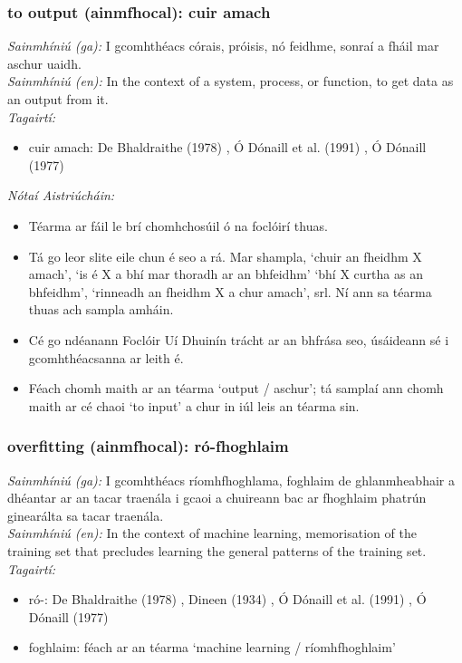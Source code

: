 \subsubsection*{to output (ainmfhocal): cuir amach}
 \noindent \textit{Sainmhíniú (ga):} I gcomhthéacs córais, próisis, nó feidhme, sonraí a fháil mar aschur uaidh.
\\
 \noindent \textit{Sainmhíniú (en):} In the context of a system, process, or function, to get data as an output from it.
\\
 \noindent \textit{Tagairtí:}
\begin{itemize}
	\item cuir amach: De Bhaldraithe (1978) \cite{de-bhaldraithe}, Ó Dónaill et al. (1991) \cite{focloir-beag}, Ó Dónaill (1977) \cite{odonaill}
\end{itemize}

 \noindent \textit{Nótaí Aistriúcháin:}
\begin{itemize}
	\item Téarma ar fáil le brí chomhchosúil ó na foclóirí thuas.
	\item Tá go leor slite eile chun é seo a rá. Mar shampla, `chuir an fheidhm X amach', `is é X a bhí mar thoradh ar an bhfeidhm' `bhí X curtha as an bhfeidhm', `rinneadh an fheidhm X a chur amach', srl. Ní ann sa téarma thuas ach sampla amháin.
	\item Cé go ndéanann Foclóir Uí Dhuinín trácht ar an bhfrása seo, úsáideann sé i gcomhthéacsanna ar leith é.
	\item Féach chomh maith ar an téarma `output / aschur'; tá samplaí ann chomh maith ar cé chaoi `to input' a chur in iúl leis an téarma sin.
\end{itemize}


\subsubsection*{overfitting (ainmfhocal): ró-fhoghlaim}
 \noindent \textit{Sainmhíniú (ga):} I gcomhthéacs ríomhfhoghlama, foghlaim de ghlanmheabhair a dhéantar ar an tacar traenála i gcaoi a chuireann bac ar fhoghlaim phatrún ginearálta sa tacar traenála.
\\
 \noindent \textit{Sainmhíniú (en):} In the context of machine learning, memorisation of the training set that precludes learning the general patterns of the training set.
\\
 \noindent \textit{Tagairtí:}
\begin{itemize}
	\item ró-: De Bhaldraithe (1978) \cite{de-bhaldraithe}, Dineen (1934) \cite{dineen}, Ó Dónaill et al. (1991) \cite{focloir-beag}, Ó Dónaill (1977) \cite{odonaill}
	\item foghlaim: féach ar an téarma `machine learning / ríomhfhoghlaim'
\end{itemize}


